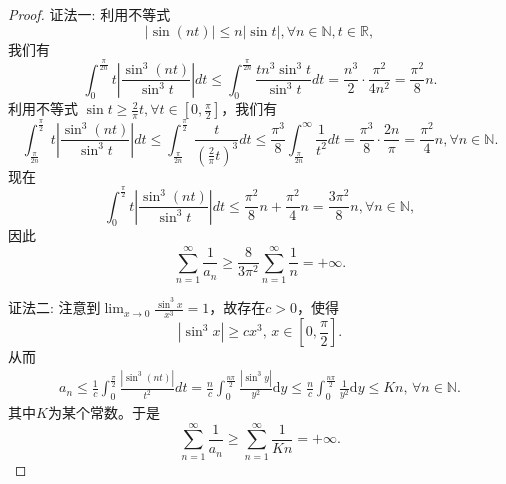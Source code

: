 \documentclass[../../main.tex]{subfiles}
\begin{document}
\begin{proof}
{\color{blue}证法一:}
利用不等式
\[
|\sin (nt)| \leqslant n |\sin t|, \forall n \in \mathbb{N}, t \in \mathbb{R},
\]
我们有
\[
\int_{0}^{\frac{\pi}{2n}} t \left| \frac{\sin^3 (nt)}{\sin^3 t} \right| dt \leqslant \int_{0}^{\frac{\pi}{2n}} \frac{t n^3 \sin^3 t}{\sin^3 t} dt = \frac{n^3}{2} \cdot \frac{\pi^2}{4n^2} = \frac{\pi^2}{8} n.
\]
利用不等式 \( \sin t \geqslant \frac{2}{\pi} t, \forall t \in \left[ 0, \frac{\pi}{2} \right] \)，我们有
\[
\int_{\frac{\pi}{2n}}^{\frac{\pi}{2}} t \left| \frac{\sin^3 (nt)}{\sin^3 t} \right| dt \leqslant \int_{\frac{\pi}{2n}}^{\frac{\pi}{2}} \frac{t}{\left( \frac{2}{\pi} t \right)^3} dt \leqslant \frac{\pi^3}{8} \int_{\frac{\pi}{2n}}^{\infty} \frac{1}{t^2} dt = \frac{\pi^3}{8} \cdot \frac{2n}{\pi} = \frac{\pi^2}{4} n, \forall n \in \mathbb{N}.
\]
现在
\[
\int_{0}^{\frac{\pi}{2}} t \left| \frac{\sin^3 (nt)}{\sin^3 t} \right| dt \leqslant \frac{\pi^2}{8} n + \frac{\pi^2}{4} n = \frac{3\pi^2}{8} n, \forall n \in \mathbb{N},
\]
因此
\[
\sum_{n = 1}^{\infty} \frac{1}{a_n} \geqslant \frac{8}{3\pi^2} \sum_{n = 1}^{\infty} \frac{1}{n} = +\infty.
\]

{\color{blue}证法二:}
注意到$\lim_{x\rightarrow 0}\frac{\sin ^3x}{x^3}=1$，故存在$c>0$，使得
\[
|\sin^3 x| \geqslant c x^3, \, x \in \left[ 0, \frac{\pi}{2} \right].
\]
从而
\begin{align*}
a_n \leqslant \frac{1}{c} \int_0^{\frac{\pi}{2}} \frac{|\sin^3 (nt)|}{t^2} dt = \frac{n}{c} \int_0^{\frac{n\pi}{2}} \frac{|\sin^3 y|}{y^2} \mathrm{d}y \leqslant \frac{n}{c} \int_0^{\frac{n\pi}{2}} \frac{1}{y^2} \mathrm{d}y \leqslant Kn, \, \forall n \in \mathbb{N}.
\end{align*}
其中$K$为某个常数。于是
\[
\sum_{n=1}^{\infty} \frac{1}{a_n} \geqslant \sum_{n=1}^{\infty} \frac{1}{Kn} = +\infty.
\]
\end{proof}
\end{document}
